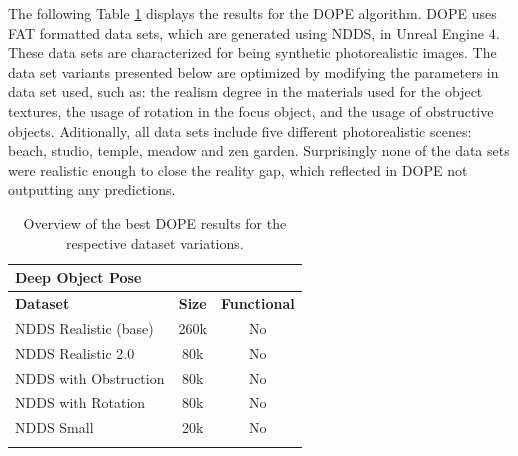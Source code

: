 The following Table \ref{tab:DOPE-results} displays the results for the DOPE algorithm. DOPE uses FAT formatted data sets, which are generated using NDDS, in Unreal Engine 4. These data sets are characterized for being synthetic photorealistic images. The data set variants presented below are optimized by modifying the parameters in data set used, such as:
the realism degree in the materials used for the object textures, the usage of rotation in the focus object, and the usage of obstructive objects. Aditionally, all data sets include five different photorealistic scenes: beach, studio, temple, meadow and zen garden. Surprisingly none of the data sets were realistic enough to close the reality gap, which reflected in DOPE not outputting any predictions.

\begin{longtable}{|l|c||c|}                            \hline
\multicolumn{3}{|l|}{\textbf{Deep Object Pose}}              \\\hline
\textbf{Dataset}            & \textbf{Size}  & \textbf{Functional}            \\ \hline
NDDS Realistic (base)       & 260k      & No                             \\ \hline
NDDS Realistic 2.0          & 80k       & No                             \\ \hline
NDDS with Obstruction       & 80k       & No                             \\ \hline
NDDS with Rotation          & 80k       & No                             \\ \hline
NDDS Small                  & 20k       & No                             \\ \hline
\caption{Overview of the best DOPE results for the respective dataset variations.} \label{tab:DOPE-results}
\end{longtable}

